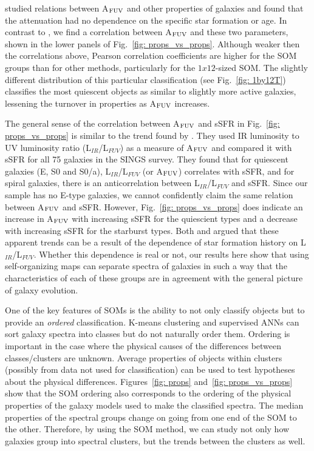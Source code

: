          studied relations between A$_{\rm {FUV}}$ and other properties of galaxies and found that the attenuation had no dependence on the specific star formation or age.
        In contrast to , we find a correlation between A$_{\rm {FUV}}$ and these two parameters, shown in the lower panels of Fig.~\ref{fig: props_vs_props}.
        Although weaker then the correlations above, Pearson correlation coefficients are higher for the SOM groups than for other methods, particularly for the $1x12$-sized SOM. 
        The slightly different distribution of this particular classification (see Fig.~\ref{fig: 1by12T}) classifies the most quiescent objects as similar to slightly more active galaxies, lessening the turnover in properties as A$_{\rm {FUV}}$ increases.
        
        The general sense of the correlation between A$_{\rm {FUV}}$ and sSFR in Fig.~\ref{fig: props_vs_props} is similar to the trend found by \cite{Dale07}.
        They used IR luminosity to UV luminosity ratio (L$_{IR}$/L$_{FUV}$) as a measure of A$_{\rm {FUV}}$ and compared it with sSFR for all 75 galaxies in the SINGS survey.
        They found that for quiescent galaxies (E, S0 and S0/a), L$_{IR}$/L$_{FUV}$ (or A$_{\rm {FUV}}$) correlates with sSFR, and for spiral galaxies, there is an anticorrelation between L$_{IR}$/L$_{FUV}$ and sSFR.
        Since our sample has no E-type galaxies, we cannot confidently claim the same relation between A$_{\rm {FUV}}$ and sSFR. 
        However, Fig.~\ref{fig: props_vs_props} does indicate an increase in A$_{\rm {FUV}}$ with increasing sSFR for the quiescient types and a decrease with increasing sSFR for the starburst types.
        Both \cite{Dale07} and  argued that these apparent trends can be a result of the dependence of star formation history on L$_{IR}$/L$_{FUV}$.
        Whether this dependence is real or not, our results here show that using self-organizing maps can separate spectra of galaxies in such a way that the characteristics of each of these groups are in agreement with the general picture of galaxy evolution.
          
       One of the key features of SOMs is the ability to not only classify objects but to provide an {\em ordered} classification.
       K-means clustering and supervised ANNs can sort galaxy spectra into classes but do not naturally order them. Ordering is important in the case where the physical causes of the differences between classes/clusters are unknown. Average properties of objects within clusters (possibly from data not used for classification) can be used to test hypotheses about the physical differences. 
       Figures~\ref{fig: props} and~\ref{fig: props_vs_props} show that the SOM ordering also corresponds to the ordering of the physical properties of the galaxy models used to make the classified spectra. 
       The median properties of the spectral groups change on going from one end of the SOM to the other.
       Therefore, by using the SOM method, we can study not only how galaxies group into spectral clusters, but the trends between the clusters as well.